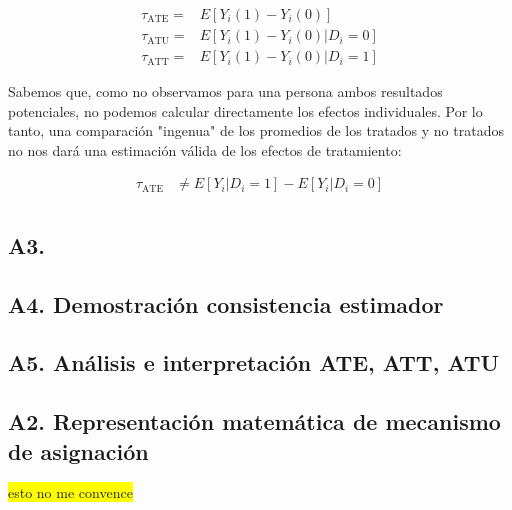 \documentclass[12pt, letter]{article}
\begin{document}
\begin{align}
\tau_{\text{ATE}} =& E[Y_i(1) - Y_i(0)] \\
\tau_{\text{ATU}} =& E[Y_i(1) - Y_i(0) | D_i = 0] \\
\tau_{\text{ATT}} =& E[Y_i(1) - Y_i(0) | D_i = 1]
\end{align}


Sabemos que, como no observamos para una persona ambos resultados potenciales, no podemos calcular directamente los efectos individuales. Por lo tanto, una comparación "ingenua" de los promedios de los tratados y no tratados no nos dará una estimación válida de los efectos de tratamiento:

\begin{align*}
\tau_{\text{ATE}} &\neq E[Y_i | D_i = 1] - E[Y_i | D_i = 0] \\
\end{align*}

\subsection{A3. }
\subsection{A4. Demostración consistencia estimador}
\subsection{A5. Análisis e interpretación ATE, ATT, ATU}
\subsection{A2. Representación matemática de mecanismo de asignación}

\colorbox{yellow}{esto no me convence}
\end{document}
